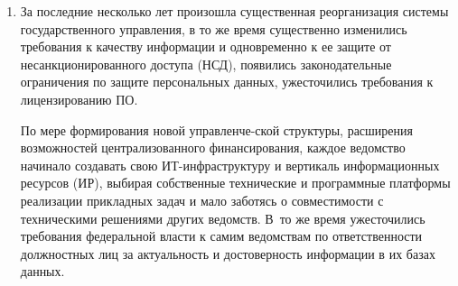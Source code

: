 \begin{multicols}{2}
\begin{enumerate}[1.]
      В регионах-донорах создавалась собственная, не совместимая с другими регионами 
      ИТ-ин\-фра\-струк\-ту\-ра, проводилась собственная техническая политика, закупались и 
внедрялись технические и программные платформы (в том числе базовые операционные сис\-те\-мы, 
сис\-те\-мы управления базами данных (СУБД) и 
инструментальные средства), самостоятельно выбирались методы, стандарты и технологии 
интеграции. Разрабатываемые и на территориальном уровне внед\-ря\-емые собственные типовые 
решения в интересах подразделений ведомств, расположенных в регионе, интегрировались на 
основе инструментария мощных и дорогостоящих СУБД, поскольку региональные власти не 
особенно заботились о лицензионной чис\-то\-те, а следовательно, и стоимости используемого 
программного обеспечения (ПО). Координация множества региональных разработок в интересах ведомства на федеральном 
уровне (руководства ведомства) была затруднена, а зачастую невозможна.
      
      В~дотационных регионах отсутствие до\-ста\-точных средств на внедрение и обучение, 
не\-раз\-витость ИТ-ин\-фра\-струк\-ту\-ры и недостаток спе\-циалистов, владеющих современными 
компьютерными технологиями, привели к консервации технических решений 90-х годов 
прош\-ло\-го века, основанных чаще всего еще на\linebreak технологиях MS DOS.
      
      Значительный разрыв между регионами-до\-но\-ра\-ми и дотационными регионами (в 
      5--10~раз) наблюдается в настоящее время как в показателях развитости 
      ИТ-ин\-фра\-струк\-ту\-ры\linebreak
       (оснащенность учреждений и домохозяйств фиксированной и 
мобильной связью, компьютерами, высокоскоростным Интернетом, средствами 
автоматизации деятельности), так и в показателях уровня накопленного <<человеческого 
капитала>> (знаний и опыта населения в использовании современных ИТ)~[1].
\item За последние несколько лет произошла существенная реорганизация системы 
государственного управления, в то же время существенно изменились требования к качеству 
информации и одновременно к ее защите от несанкционированного доступа (НСД), появились 
законодательные ограничения по защите персональных данных, ужесточились требования к 
лицензированию ПО.
      
      По мере формирования новой управленче-\linebreak ской структуры, расширения возможностей 
централизованного финансирования, каждое ведомст\-во начинало создавать свою 
      ИТ-ин\-фраструкту\-ру и вертикаль информационных ресурсов (ИР), выбирая собственные 
технические и прог\-рам\-мные платформы реализации прикладных задач и мало заботясь о 
со\-вмес\-ти\-мости с техническими решениями других ведомств. В~то же время ужесточились 
требования федеральной власти к самим ведомствам по ответственности должностных лиц за 
актуальность и достоверность информации в их базах данных. 
{ %

}
\end{enumerate}
\end{multicols}
